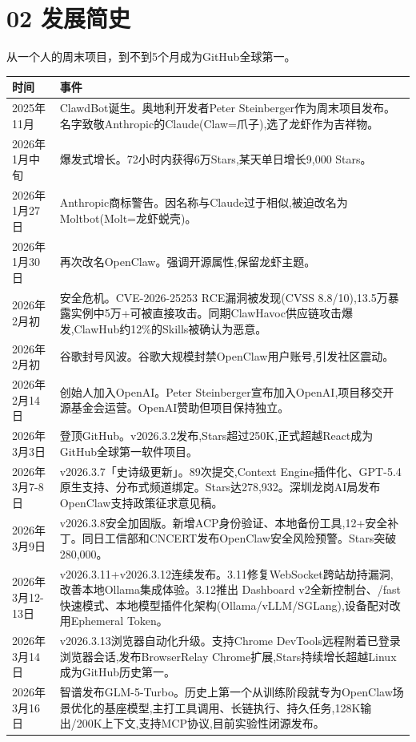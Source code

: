 \documentclass[
  10
]{article}
\newcounter{none} %
\begin{document}
\section{02 发展简史}\label{ux53d1ux5c55ux7b80ux53f2}

从一个人的周末项目，到不到5个月成为GitHub全球第一。

{\def\LTcaptype{none} %
\begin{longtable}[]{@{}|l|l|@{}}
\toprule\noalign{}
\endhead
\bottomrule\noalign{}
\endlastfoot
\hline
时间 & 事件 \\
\hline
2025年11月 & ClawdBot诞生。奥地利开发者Peter
Steinberger作为周末项目发布。名字致敬Anthropic的Claude(Claw=爪子),选了龙虾作为吉祥物。 \\
\hline
2026年1月中旬 & 爆发式增长。72小时内获得6万Stars,某天单日增长9,000
Stars。 \\
\hline
2026年1月27日 &
Anthropic商标警告。因名称与Claude过于相似,被迫改名为Moltbot(Molt=龙虾蜕壳)。 \\
\hline
2026年1月30日 & 再次改名OpenClaw。强调开源属性,保留龙虾主题。 \\
\hline
2026年2月初 & 安全危机。CVE-2026-25253 RCE漏洞被发现(CVSS
8.8/10),13.5万暴露实例中5万+可被直接攻击。同期ClawHavoc供应链攻击爆发,ClawHub约12\%的Skills被确认为恶意。 \\
\hline
2026年2月初 &
谷歌封号风波。谷歌大规模封禁OpenClaw用户账号,引发社区震动。 \\
\hline
2026年2月14日 & 创始人加入OpenAI。Peter
Steinberger宣布加入OpenAI,项目移交开源基金会运营。OpenAI赞助但项目保持独立。 \\
\hline
2026年3月3日 &
登顶GitHub。v2026.3.2发布,Stars超过250K,正式超越React成为GitHub全球第一软件项目。 \\
\hline
2026年3月7-8日 & v2026.3.7「史诗级更新」。89次提交,Context
Engine插件化、GPT-5.4原生支持、分布式频道绑定。Stars达278,932。深圳龙岗AI局发布OpenClaw支持政策征求意见稿。 \\
\hline
2026年3月9日 &
v2026.3.8安全加固版。新增ACP身份验证、本地备份工具,12+安全补丁。同日工信部和CNCERT发布OpenClaw安全风险预警。Stars突破280,000。 \\
\hline
2026年3月12-13日 &
v2026.3.11+v2026.3.12连续发布。3.11修复WebSocket跨站劫持漏洞,改善本地Ollama集成体验。3.12推出
Dashboard v2全新控制台、/fast
快速模式、本地模型插件化架构(Ollama/vLLM/SGLang),设备配对改用Ephemeral
Token。 \\
\hline
2026年3月14日 & v2026.3.13浏览器自动化升级。支持Chrome
DevTools远程附着已登录浏览器会话,发布BrowserRelay
Chrome扩展,Stars持续增长超越Linux成为GitHub历史第一。 \\
\hline
2026年3月16日 &
智谱发布GLM-5-Turbo。历史上第一个从训练阶段就专为OpenClaw场景优化的基座模型,主打工具调用、长链执行、持久任务,128K输出/200K上下文,支持MCP协议,目前实验性闭源发布。 \\
\hline
\end{longtable}
}
\end{document}
